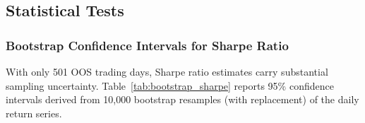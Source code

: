 \documentclass[a4paper]{report}
\begin{document}
\begin{table}[htbp]
    \centering
    \caption{Per-pair $z$-score mean-reversion backtest metrics (OOS: January 2024 -- December 2025). Entry at $\pm2.0\sigma$, exit at $\pm0.5\sigma$.}
    \label{tab:perpair_backtest}
\end{table}

\subsection{Statistical Tests}

\subsubsection{Bootstrap Confidence Intervals for Sharpe Ratio}

With only 501 OOS trading days, Sharpe ratio estimates carry substantial sampling uncertainty.
Table~\ref{tab:bootstrap_sharpe} reports 95\% confidence intervals derived from 10{,}000
bootstrap resamples (with replacement) of the daily return series.
\end{document}
